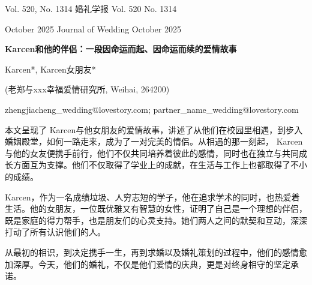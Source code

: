 \documentclass[a4paper]{article}
\begin{document}
\begin{CJK}{UTF8}{gbsn}

\begin{center}
{\large Vol. 520, No. 1314 \hfill 婚礼学报 \hfill Vol. 520 No. 1314}

{\large October 2025 \hfill Journal of Wedding \hfill October 2025}
\end{center}

\noindent{}

\vspace{2em}

\begin{center}
{\Large\bf  Karcen和他的伴侣：一段因命运而起、因命运而续的爱情故事}
\end{center}

\vspace{1em}

\begin{center}
 Karcen*,  Karcen女朋友*
\end{center}

\begin{center}
\small (老郑与xxx幸福爱情研究所, Weihai, 264200)
\end{center}

\begin{center}
\small zhengjiacheng\_wedding@lovestory.com; partner\_name\_wedding@lovestory.com
\end{center}

\vspace{1em}

 本文呈现了 Karcen与他女朋友的爱情故事，讲述了从他们在校园里相遇，到步入婚姻殿堂，如何一路走来，成为了一对完美的情侣。从相遇的那一刻起， Karcen与他的女友便携手前行，他们不仅共同培养着彼此的感情，同时也在独立与共同成长方面互为支撑。他们不仅取得了学业上的成就，在生活与工作上也都取得了不小的成绩。

 Karcen，作为一名成绩垃圾、人穷志短的学子，他在追求学术的同时，也热爱着生活。他的女朋友，一位既优雅又有智慧的女性，证明了自己是一个理想的伴侣，既是家庭的得力帮手，也是朋友们的心灵支持。她们两人之间的默契和互动，深深打动了所有认识他们的人。

从最初的相识，到决定携手一生，再到求婚以及婚礼策划的过程中，他们的感情愈加深厚。今天，他们的婚礼，不仅是他们爱情的庆典，更是对终身相守的坚定承诺。


\end{CJK}
\end{document}
